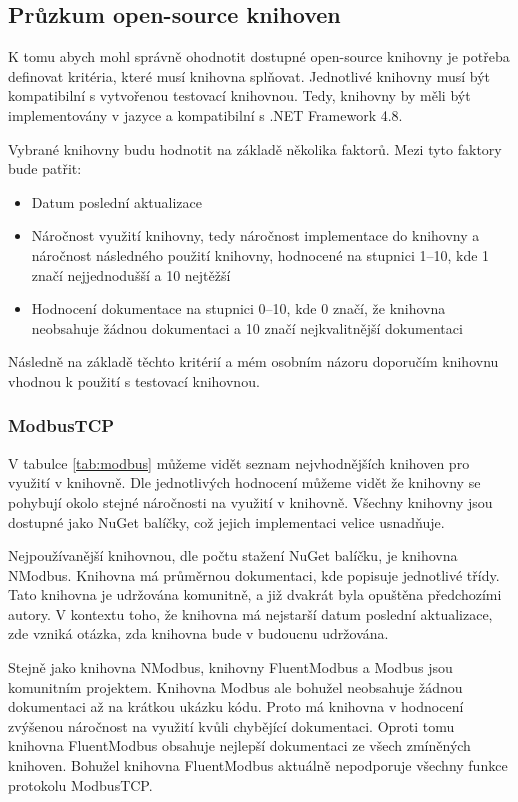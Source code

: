 \subsection{Průzkum open-source knihoven}
K tomu abych mohl správně ohodnotit dostupné open-source knihovny je potřeba definovat kritéria, které musí knihovna splňovat. Jednotlivé knihovny musí být kompatibilní s vytvořenou testovací knihovnou. Tedy, knihovny by měli být implementovány v jazyce \csharp{} a kompatibilní s .NET Framework 4.8. 

Vybrané knihovny budu hodnotit na základě několika faktorů. Mezi tyto faktory bude patřit:

\begin{itemize}
    \item Datum poslední aktualizace
    \item Náročnost využití knihovny, tedy náročnost implementace do knihovny a náročnost následného použití knihovny, hodnocené na stupnici 1--10, kde 1 značí nejjednodušší a 10 nejtěžší 
    \item Hodnocení dokumentace na stupnici 0--10, kde 0 značí, že knihovna neobsahuje žádnou dokumentaci a 10 značí nejkvalitnější dokumentaci
\end{itemize}

Následně na základě těchto kritérií a mém osobním názoru doporučím knihovnu vhodnou k použití s testovací knihovnou. 

\subsubsection{ModbusTCP}

V tabulce \ref{tab:modbus} můžeme vidět seznam nejvhodnějších knihoven pro využití v knihovně. Dle jednotlivých hodnocení můžeme vidět že knihovny se pohybují okolo stejné náročnosti na využití v knihovně. Všechny knihovny jsou dostupné jako NuGet balíčky, což jejich implementaci velice usnadňuje.

Nejpoužívanější knihovnou, dle počtu stažení NuGet balíčku, je knihovna NModbus. Knihovna má průměrnou dokumentaci, kde popisuje jednotlivé třídy. Tato knihovna je udržována komunitně, a již dvakrát byla opuštěna předchozími autory. V kontextu toho, že knihovna má nejstarší datum poslední aktualizace, zde vzniká otázka, zda knihovna bude v budoucnu udržována.

Stejně jako knihovna NModbus, knihovny FluentModbus a Modbus jsou komunitním projektem. Knihovna Modbus ale bohužel neobsahuje žádnou dokumentaci až na krátkou ukázku kódu. Proto má knihovna v hodnocení zvýšenou náročnost na využití kvůli chybějící dokumentaci. Oproti tomu knihovna FluentModbus obsahuje nejlepší dokumentaci ze všech zmíněných knihoven. Bohužel knihovna FluentModbus aktuálně nepodporuje všechny funkce protokolu ModbusTCP. 

